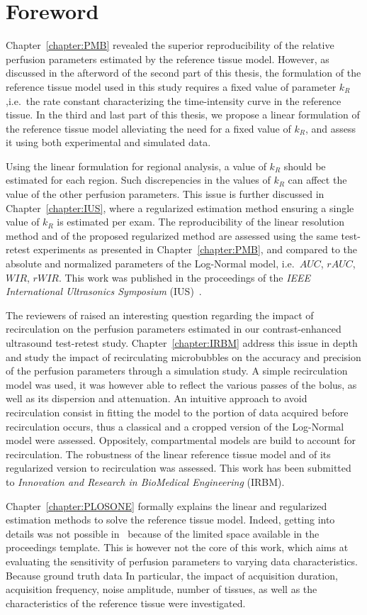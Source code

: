 \chapter*{Foreword}
Chapter~\ref{chapter:PMB} revealed the superior reproducibility of the relative perfusion parameters estimated by the reference tissue model.
However, as discussed in the afterword of the second part of this thesis, the formulation of the reference tissue model used in this study requires a fixed value of parameter $k_R$,i.e.~the rate constant characterizing the time-intensity curve in the reference tissue.
In the third and last part of this thesis, we propose a linear formulation of the reference tissue model alleviating the need for a fixed value of $k_R$, and assess it using both experimental and simulated data.

Using the linear formulation for regional analysis, a value of $k_R$ should be estimated for each region.
Such discrepencies in the values of $k_R$ can affect the value of the other perfusion parameters.
This issue is further discussed in Chapter~\ref{chapter:IUS}, where a regularized estimation method ensuring a single value of $k_R$ is estimated per exam.
The reproducibility of the linear resolution method and of the proposed regularized method are assessed using the same test-retest experiments as presented in Chapter~\ref{chapter:PMB}, and compared to the absolute and normalized parameters of the Log-Normal model, i.e.~$AUC$, $rAUC$, $WIR$, $rWIR$.
This work was published in the proceedings of the {\em IEEE International Ultrasonics Symposium} (IUS)~\cite{Doury:2016fi}.

The reviewers of \cite{Doury:2016fi} raised an interesting question regarding the impact of recirculation on the perfusion parameters estimated in our contrast-enhanced ultrasound test-retest study.
Chapter~\ref{chapter:IRBM} address this issue in depth and study the impact of recirculating microbubbles on the accuracy and precision of the perfusion parameters through a simulation study.
A simple recirculation model was used, it was however able to reflect the various passes of the bolus, as well as its dispersion and attenuation.
An intuitive approach to avoid recirculation consist in fitting the model to the portion of data acquired before recirculation occurs, thus a classical and a cropped version of the Log-Normal model were assessed.
Oppositely, compartmental models are build to account for recirculation.
The robustness of the linear reference tissue model and of its regularized version to recirculation was assessed.
This work has been submitted to {\em Innovation and Research in BioMedical Engineering} (IRBM).

Chapter~\ref{chapter:PLOSONE} formally explains the linear and regularized estimation methods to solve the reference tissue model.
Indeed, getting into details was not possible in~\cite{Doury2017wn} because of the limited space available in the proceedings template.
This is however not the core of this work, which aims at evaluating the sensitivity of perfusion parameters to varying data characteristics.
Because ground truth data 
In particular, the impact of acquisition duration, acquisition frequency, noise amplitude, number of tissues, as well as the characteristics of the reference tissue were investigated.